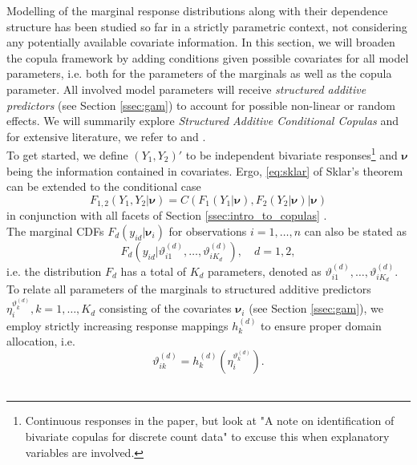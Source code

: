 
Modelling of the marginal response distributions along with their dependence structure has been studied so far in a strictly parametric context, not considering any potentially available covariate information. In this section, we will broaden the copula framework by adding conditions given possible covariates for all model parameters, i.e. both for the parameters of the marginals as well as the copula parameter. All involved model parameters will receive \textit{structured additive predictors} (see Section \ref{ssec:gam}) to account for possible non-linear or random effects. We will summarily explore \textit{Structured Additive Conditional Copulas} and for extensive literature, we refer to \cite{klein2016simultaneous} and \cite{vatter2019gamcopula}. \\

To get started, we define $(Y_1, Y_2)'$ to be independent bivariate responses\footnote{Continuous responses in the paper, but look at "A note on identification of bivariate copulas for discrete count data" to excuse this when explanatory variables are involved.} and $\bm{\nu}$ being the information contained in covariates. Ergo, \autoref{eq:sklar} of Sklar's theorem can be extended to the conditional case
\begin{equation}
F_{1,2}\left(Y_{1}, Y_{2} | \bm{\nu} \right)=C\left(F_{1}\left(Y_{1} | \bm{\nu} \right), F_{2}\left(Y_{2} | \bm{\nu} \right) | \bm{\nu} \right)
\label{eq:sklar_conditional}
\end{equation}
in conjunction with all facets of Section \ref{ssec:intro_to_copulas} \citep{patton2006modelling}.\\
The marginal \acp{CDF} $F_{d}\left(y_{i d} | \bm{\nu}_i\right)$ for observations $i = 1,\ldots, n$ can also be stated as
\begin{equation}
F_{d}\left(y_{i d} | \vartheta_{i 1}^{(d)}, \ldots, \vartheta_{i K_{d}}^{(d)}\right), \quad d = 1, 2,
\end{equation}
i.e. the distribution $F_d$ has a total of $K_d$ parameters, denoted as $\vartheta_{i 1}^{(d)}, \ldots, \vartheta_{i K_{d}}^{(d)}$.
To relate all parameters of the marginals to structured additive predictors $\eta_i^{\vartheta_k^{(d)}},  k = 1,\ldots, K_d$ consisting of the covariates $\bm{\nu}_i$ (see Section \ref{ssec:gam}), we employ strictly increasing response mappings $h_k^{(d)}$ to ensure proper domain allocation, i.e.
\begin{equation}
\vartheta_{i k}^{(d)}=h_{k}^{(d)}(\eta_{i}^{\vartheta_{k}^{(d)}}).
\label{eq:parameter_mapping}
\end{equation}
\\

